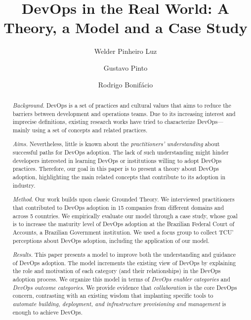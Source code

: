 \documentclass[preprint,12pt,3p]{elsarticle}
\begin{document}
\begin{frontmatter}

\title{DevOps in the Real World: A Theory, a Model and a Case Study}

\author[label1]{Welder Pinheiro Luz}
\address[label1]{Brazilian Federal Court of Accounts}

\author[label2]{Gustavo Pinto}
\address[label2]{Federal University of Par\'a}

\author[label3]{Rodrigo Bonif\'acio}
\address[label3]{University of Bras\'{i}lia}

\begin{abstract}

 \emph{Background.} DevOps is a set of practices and cultural values
  that aims to reduce the
  barriers between development and operations
  teams. Due to its increasing interest and imprecise
  definitions, existing research works have tried to
  characterize DevOps---mainly using a set of concepts and related practices.

  \emph{Aims.} Nevertheless, little is
  known about the \emph{practitioners' understanding}
  about successful paths for DevOps adoption. The lack of such understanding
  might hinder developers interested in learning DevOps or institutions willing to adopt DevOps practices. Therefore, our goal
  in this paper is to present a theory about DevOps adoption, highlighting the
  main related concepts that contribute to its adoption in industry.

  \emph{Method.} Our work builds upon classic Grounded Theory. We interviewed practitioners
  that contributed to DevOps adoption in 15 companies from different
  domains and across 5 countries. We empirically evaluate our model through
  a case study, whose goal is to increase the maturity level of
  DevOps adoption at the Brazilian Federal Court of Accounts,
  a Brazilian Government institution. We used a focus group to collect
  TCU' perceptions about DevOps adoption, including the application of our model.

  \emph{Results.} This paper
  presents a model to improve both the understanding and guidance
  of DevOps adoption. The model increments the existing view of
  DevOps by explaining the role and motivation of each
  category (and their relationships) in the DevOps adoption process.
  We organize this model in terms of \emph{DevOps enabler categories} and
  \emph{DevOps outcome categories}. We provide evidence that
  \emph{collaboration} is the core DevOps concern, contrasting with an existing
  wisdom that implanting specific tools to \emph{automate building, deployment,
  and infrastructure provisioning and management} is enough to achieve DevOps.


\end{abstract}
\end{frontmatter}
\end{document}
